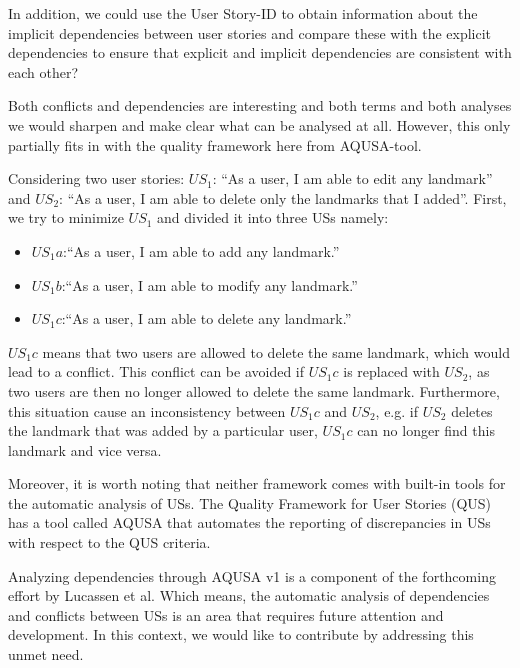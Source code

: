 In addition, we could use the User Story-ID to obtain information about the implicit dependencies between user stories and compare these with the explicit dependencies to ensure that explicit and implicit dependencies are consistent with each other?

Both conflicts and dependencies are interesting and both terms and both analyses we would sharpen  and make clear what can be analysed at all. However, this only partially fits in with the quality framework here from AQUSA-tool.

\begin{example}\label{example_conflict}
Considering two user stories:  $US_1$: \enquote{As a user, I am able to edit any landmark} and $US_2$: \enquote{As a user, I am able to delete only the landmarks that I added}. First, we try to minimize $US_1$ and divided it into three USs namely:
\begin{itemize}
\item $US_1a$:\enquote{As a user, I am able to add any landmark.}
\item $US_1b$:\enquote{As a user, I am able to modify any landmark.}
\item $US_1c$:\enquote{As a user, I am able to delete any landmark.}
\end{itemize}
$US_1c$ means that two users are allowed to delete the same landmark, which would lead to a conflict. %
This conflict can be avoided if $US_1c$ is replaced with $US_2$, as two users are then no longer allowed to delete the same landmark.
Furthermore, this situation cause an inconsistency between $US_1c$ and $US_2$, e.g. if $US_2$ deletes the landmark that was added by a particular user, $US_1c$ can no longer find this landmark and vice versa.
\end{example}

Moreover, it is worth noting that neither framework comes with built-in tools for the automatic analysis of USs. %
The Quality Framework for User Stories (QUS) has a tool called AQUSA that automates the reporting of discrepancies in USs with respect to the QUS criteria. 

Analyzing dependencies through AQUSA v1 is a component of the forthcoming effort by Lucassen et al. Which means, the automatic analysis of dependencies and conflicts between USs is an area that requires future attention and development. In this context, we would like to contribute by addressing this unmet need.
